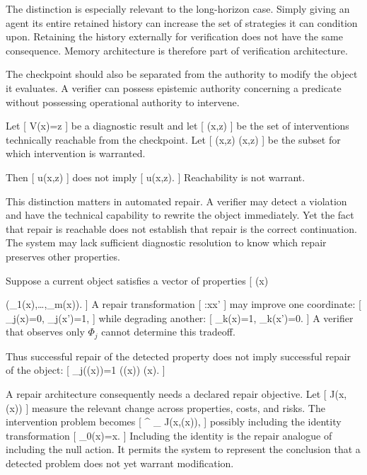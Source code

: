 \documentclass[11pt]{article}
\begin{document}
The distinction is especially relevant to the long-horizon case. Simply giving an agent its entire retained history can increase the set of strategies it can condition upon. Retaining the history externally for verification does not have the same consequence. Memory architecture is therefore part of verification architecture.

The checkpoint should also be separated from the authority to modify the object it evaluates. A verifier can possess epistemic authority concerning a predicate without possessing operational authority to intervene.

Let
[
V(x)=z
]
be a diagnostic result and let
[
(x,z)
]
be the set of interventions technically reachable from the checkpoint. Let
[
(x,z)
\subseteq
{}(x,z)
]
be the subset for which intervention is warranted.

Then
[
u\in{}(x,z)
]
does not imply
[
u\in{}(x,z).
]
Reachability is not warrant.

This distinction matters in automated repair. A verifier may detect a violation and have the technical capability to rewrite the object immediately. Yet the fact that repair is reachable does not establish that repair is the correct continuation. The system may lack sufficient diagnostic resolution to know which repair preserves other properties.

Suppose a current object satisfies a vector of properties
[
\mathbf{\Phi}(x)

(\Phi_1(x),\ldots,\Phi_m(x)).
]
A repair transformation
[
\rho:x\mapsto x'
]
may improve one coordinate:
[
\Phi_j(x)=0,
\qquad
\Phi_j(x')=1,
]
while degrading another:
[
\Phi_k(x)=1,
\qquad
\Phi_k(x')=0.
]
A verifier that observes only $\Phi_j$ cannot determine this tradeoff.

Thus successful repair of the detected property does not imply successful repair of the object:
[
\Phi_j(\rho(x))=1
\quad\not\Rightarrow\quad
\mathbf{\Phi}(\rho(x))
\succeq
\mathbf{\Phi}(x).
]

A repair architecture consequently needs a declared repair objective. Let
[
J(x,\rho(x))
]
measure the relevant change across properties, costs, and risks. The intervention problem becomes
[
\rho^\star
\in
\arg\min_{\rho\in{}}
J(x,\rho(x)),
]
possibly including the identity transformation
[
\rho_0(x)=x.
]
Including the identity is the repair analogue of including the null action. It permits the system to represent the conclusion that a detected problem does not yet warrant modification.
\end{document}
